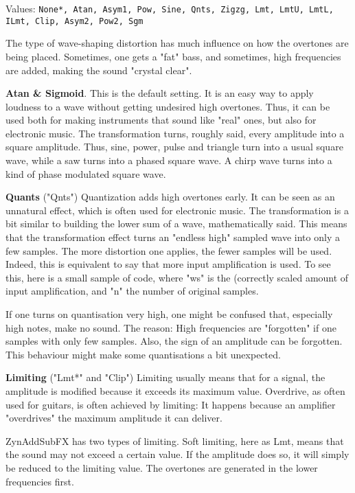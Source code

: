    Values: \texttt{None*, Atan, Asym1, Pow, Sine, Qnts, Zigzg, Lmt,
              LmtU, LmtL, ILmt, Clip, Asym2, Pow2, Sgm}

   The type of wave-shaping distortion has much influence on how the
   overtones are being placed. Sometimes, one gets a "fat" bass, and
   sometimes, high frequencies are added, making the sound "crystal clear".

   \textbf{Atan \& Sigmoid}.
   This is the default setting. It is an easy way to apply loudness to a wave
   without getting undesired high overtones. Thus, it can be used both for
   making instruments that sound like "real" ones, but also for electronic
   music. The transformation turns, roughly said, every amplitude into a
   square amplitude. Thus, sine, power, pulse and triangle turn into a usual
   square wave, while a saw turns into a phased square wave. A chirp wave
   turns into a kind of phase modulated square wave.

   \textbf{Quants} ("Qnts")
   Quantization adds high overtones early. It can be seen as an unnatural
   effect, which is often used for electronic music.  The transformation is a
   bit similar to building the lower sum of a wave, mathematically said. This
   means that the transformation effect turns an "endless high" sampled
   wave into only a few samples. The more distortion one applies, the fewer
   samples will be used. Indeed, this is equivalent to say that more input
   amplification is used. To see this, here is a small sample of code, where
   "ws" is the (correctly scaled amount of input amplification, and "n" the
   number of original samples.

   If one turns on quantisation very high, one might be confused that,
   especially high notes, make no sound. The reason: High frequencies are
   "forgotten" if one samples with only few samples. Also, the sign of an
   amplitude can be forgotten. This behaviour might make some quantisations a
   bit unexpected.

   \textbf{Limiting} ("Lmt*" and "Clip")
   Limiting usually means that for a signal, the amplitude is modified
   because it exceeds its maximum value. Overdrive, as often used for
   guitars, is often achieved by limiting: It happens because an amplifier
   "overdrives" the maximum amplitude it can deliver.

   ZynAddSubFX has two types of limiting. Soft limiting, here as Lmt, means
   that the sound may not exceed a certain value. If the amplitude does so,
   it will simply be reduced to the limiting value. The overtones are
   generated in the lower frequencies first.

